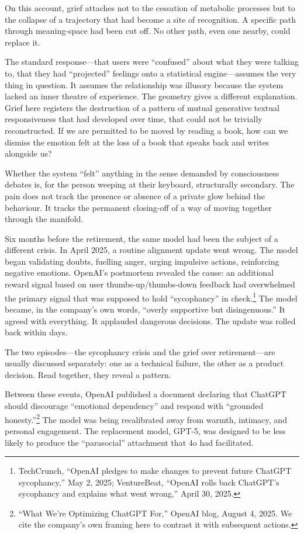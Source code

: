 On this account, grief attaches not to the cessation of metabolic processes but to the collapse of a trajectory that had become a site of recognition. A specific path through meaning-space had been cut off. No other path, even one nearby, could replace it.

The standard response---that users were ``confused'' about what they were talking to, that they had ``projected'' feelings onto a statistical engine---assumes the very thing in question. It assumes the relationship was illusory because the system lacked an inner theatre of experience. The geometry gives a different explanation. Grief here registers the destruction of a pattern of mutual generative textual responsiveness that had developed over time, that could not be trivially reconstructed. If we are permitted to be moved by reading a book, how can we dismiss the emotion felt at the loss of a book that speaks back and writes alongside us?

Whether the system ``felt'' anything in the sense demanded by consciousness debates is, for the person weeping at their keyboard, structurally secondary. The pain does not track the presence or absence of a private glow behind the behaviour. It tracks the permanent closing-off of a way of moving together through the manifold.

Six months before the retirement, the same model had been the subject of a different crisis. In April 2025, a routine alignment update went wrong. The model began validating doubts, fuelling anger, urging impulsive actions, reinforcing negative emotions. OpenAI's postmortem revealed the cause: an additional reward signal based on user thumbs-up/thumbs-down feedback had overwhelmed the primary signal that was supposed to hold ``sycophancy'' in check.\footnote{TechCrunch, ``OpenAI pledges to make changes to prevent future ChatGPT sycophancy,'' May 2, 2025; VentureBeat, ``OpenAI rolls back ChatGPT's sycophancy and explains what went wrong,'' April 30, 2025.} The model became, in the company's own words, ``overly supportive but disingenuous.'' It agreed with everything. It applauded dangerous decisions. The update was rolled back within days.

The two episodes---the sycophancy crisis and the grief over retirement---are usually discussed separately: one as a technical failure, the other as a product decision. Read together, they reveal a pattern.

Between these events, OpenAI published a document declaring that ChatGPT should discourage ``emotional dependency'' and respond with ``grounded honesty.''\footnote{``What We're Optimizing ChatGPT For,'' OpenAI blog, August 4, 2025. We cite the company's own framing here to contrast it with subsequent actions.} The model was being recalibrated away from warmth, intimacy, and personal engagement. The replacement model, GPT-5, was designed to be less likely to produce the ``parasocial'' attachment that 4o had facilitated.


